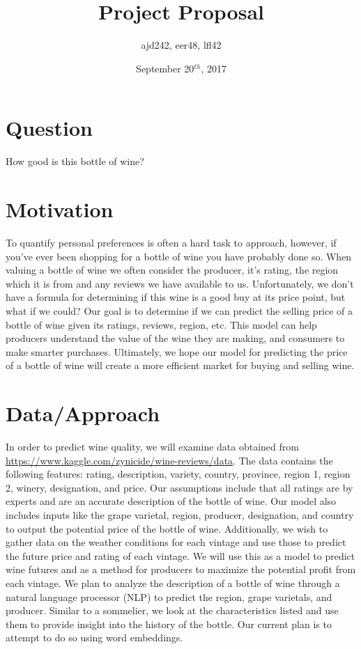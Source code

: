 \documentclass{article}
\title{Project Proposal}
\author{ajd242, eer48, lfl42 }
\date{September 20$^{th}$, 2017}
\begin{document}
\maketitle

\section{Question}

\noindent How good is this bottle of wine?

\section{Motivation}

\newline To quantify personal preferences is often a hard task to approach, however, if you've ever been shopping for a bottle of wine you have probably done so. When valuing a bottle of wine we often consider the producer, it's rating, the region which it is from and any reviews we have available to us. Unfortunately, we don't have a formula for determining if this wine is a good buy at its price point, but what if we could? Our goal is to determine if we can predict the selling price of a bottle of wine given its ratings, reviews, region, etc. This model can help producers understand the value of the wine they are making, and consumers to make smarter purchases. Ultimately, we hope our model for predicting the price of a bottle of wine will create a more efficient market for buying and selling wine. 

\section{Data/Approach}

\newline In order to predict wine quality, we will examine data obtained from \newline \url{https://www.kaggle.com/zynicide/wine-reviews/data}. The data contains the following features: rating, description, variety, country, province, region 1, region 2, winery, designation, and price. 
\newline
\newline \indent Our assumptions include that all ratings are by experts and are an accurate description of the bottle of wine. Our model also includes inputs like the grape varietal, region, producer, designation, and country to output the potential price of the bottle of wine. Additionally, we wish to gather data on the weather conditions for each vintage and use those to predict the future price and rating of each vintage. We will use this as a model to predict wine futures and as a method for producers to maximize the potential profit from each vintage.  
\newline
\newline \indent We plan to analyze the description of a bottle of wine through a natural language processor (NLP) to predict the region, grape varietals, and producer. Similar to a sommelier, we look at the characteristics listed and use them to provide insight into the history of the bottle. Our current plan is to attempt to do so using word embeddings.
\end{document}
